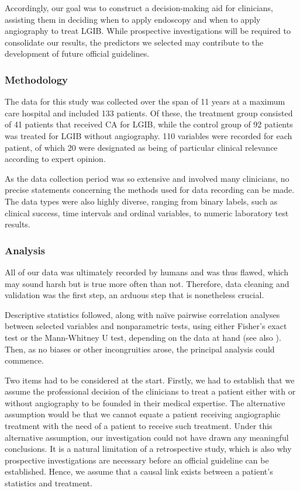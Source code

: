 Accordingly, our goal was to construct a decision-making aid for clinicians,
assisting them in deciding when to apply endoscopy and when to apply
angiography to treat LGIB. While prospective investigations will be required
to consolidate our results, the predictors we selected may contribute to the
development of future official guidelines.

\subsubsection{Methodology}\label{subsubsec:angiomethod}
The data for this study was collected over the span of \num{11} years at a
maximum care hospital and included \num{133} patients. Of these, the treatment
group consisted of \num{41} patients that received CA for LGIB, while the
control group of \num{92} patients was treated for LGIB without angiography.
\num{110} variables were recorded for each patient, of which \num{20} were
designated as being of particular clinical relevance according to expert
opinion.

As the data collection period was so extensive and involved many clinicians,
no precise statements concerning the methods used for data recording can be
made. The data types were also highly diverse, ranging from binary labels,
such as clinical success, time intervals and ordinal variables, to numeric
laboratory test results.

\subsubsection{Analysis}\label{subsubsec:angioanalysis}
All of our data was ultimately recorded by humans and was thus flawed, which
may sound harsh but is true more often than not. Therefore, data cleaning and
validation was the first step, an arduous step that is nonetheless crucial.

Descriptive statistics followed, along with na\"{i}ve pairwise correlation
analyses between selected variables and nonparametric tests, using either
Fisher's exact test or the Mann-Whitney U test, depending on the data at hand
\citep{Winters2010} (see also ). Then, as no biases
or other incongruities arose, the principal analysis could commence.

Two items had to be considered at the start. Firstly, we had to establish that
we assume the professional decision of the clinicians to treat a patient
either with or without angiography to be founded in their medical expertise.
The alternative assumption would be that we cannot equate a patient receiving
angiographic treatment with the need of a patient to receive such treatment.
Under this alternative assumption, our investigation could not have drawn any
meaningful conclusions. It is a natural limitation of a retrospective study,
which is also why prospective investigations are necessary before an official
guideline can be established. Hence, we assume that a causal link exists
between a patient's statistics and treatment.

